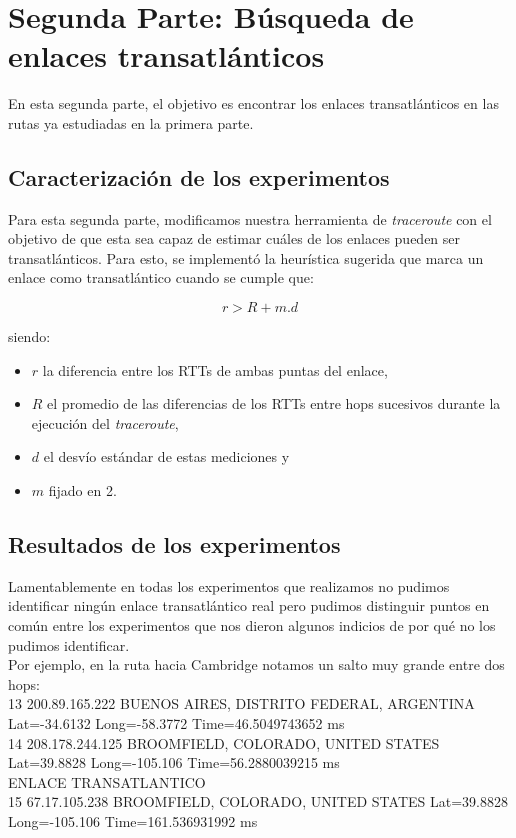 \section{Segunda Parte: Búsqueda de enlaces transatlánticos}
En esta segunda parte, el objetivo es encontrar los enlaces transatlánticos en
las rutas ya estudiadas en la primera parte.

\subsection{Caracterización de los experimentos}
Para esta segunda parte, modificamos nuestra herramienta de \emph{traceroute}
con el objetivo de que esta sea capaz de estimar cuáles de los enlaces pueden
ser transatlánticos. Para esto, se implementó la heurística sugerida que marca
un enlace como transatlántico cuando se cumple que:

$$r > R + m.d$$

siendo:
\begin{itemize}
    \item $r$ la diferencia entre los RTTs de ambas puntas del enlace,
    \item $R$ el promedio de las diferencias de los RTTs entre hops sucesivos
        durante la ejecución del \emph{traceroute},
    \item $d$ el desvío estándar de estas mediciones y
    \item $m$ fijado en 2.
\end{itemize}

\subsection{Resultados de los experimentos}
Lamentablemente en todas los experimentos que realizamos no pudimos identificar ningún enlace transatlántico real pero pudimos distinguir puntos en común entre los experimentos que nos dieron algunos indicios de por qué no los pudimos identificar.\\
Por ejemplo, en la ruta hacia Cambridge notamos un salto muy grande entre dos hops:\\

13 200.89.165.222  BUENOS AIRES, DISTRITO FEDERAL, ARGENTINA   Lat=-34.6132 Long=-58.3772   Time=46.5049743652 ms\\
14 208.178.244.125  BROOMFIELD, COLORADO, UNITED STATES   Lat=39.8828 Long=-105.106   Time=56.2880039215 ms\\
ENLACE TRANSATLANTICO\\
15 67.17.105.238  BROOMFIELD, COLORADO, UNITED STATES   Lat=39.8828 Long=-105.106   Time=161.536931992 ms\\

